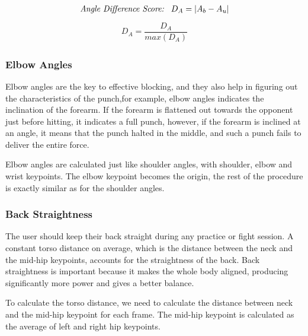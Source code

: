 \begin{align}
  \textit{Angle Difference Score:} \hspace{0.3cm} D_A = |A_{b} - A_{u}|
  \label{eq:angleDiffScore}
\end{align}
\begin{align}
  D_A = \dfrac{D_A}{max(D_A)}
  \label{eq:normalizedAngleDiff}
\end{align}

\subsubsection{Elbow Angles}
Elbow angles are the key to effective blocking, and they also help in figuring out the characteristics of the punch,for example, elbow angles indicates the inclination of the forearm. If the forearm is flattened out towards the opponent just before hitting, it indicates a full punch, however, if the forearm is inclined at an angle, it means that the punch halted in the middle, and such a punch fails to deliver the entire force. 

Elbow angles are calculated just like shoulder angles, with shoulder, elbow and wrist keypoints. The elbow keypoint becomes the origin, the rest of the procedure is exactly similar as for the shoulder angles. 
\subsubsection{Back Straightness}
The user should keep their back straight during any practice or fight session. A constant torso distance on average, which is the distance between the neck and the mid-hip keypoints, accounts for the straightness of the back. Back straightness is important because it makes the whole body aligned, producing significantly more power and gives a 
better balance. 

To calculate the torso distance, we need to calculate the distance between neck and the mid-hip keypoint for each frame. The mid-hip keypoint is calculated as the average of left and right hip keypoints. 

